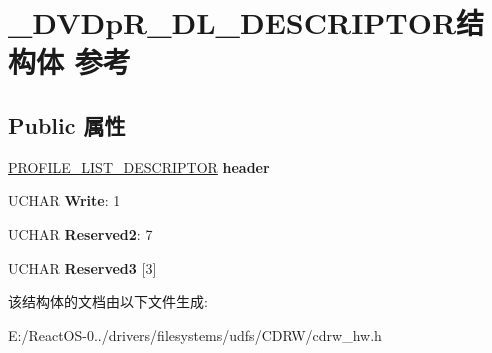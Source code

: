 \hypertarget{struct___d_v_dp_r___d_l___d_e_s_c_r_i_p_t_o_r}{}\section{\+\_\+\+D\+V\+Dp\+R\+\_\+\+D\+L\+\_\+\+D\+E\+S\+C\+R\+I\+P\+T\+O\+R结构体 参考}
\label{struct___d_v_dp_r___d_l___d_e_s_c_r_i_p_t_o_r}
\subsection*{Public 属性}
\begin{DoxyCompactItemize}
\item 
\mbox{\label{struct___d_v_dp_r___d_l___d_e_s_c_r_i_p_t_o_r_accf2fffafdd79b4c1d4f7f52979d760c}} 
\hyperlink{struct___p_r_o_f_i_l_e___l_i_s_t___d_e_s_c_r_i_p_t_o_r}{P\+R\+O\+F\+I\+L\+E\+\_\+\+L\+I\+S\+T\+\_\+\+D\+E\+S\+C\+R\+I\+P\+T\+OR} {\bfseries header}
\item 
\mbox{\label{struct___d_v_dp_r___d_l___d_e_s_c_r_i_p_t_o_r_a4c9d08a17f0e34e5d4f3aa69d9cc2932}} 
U\+C\+H\+AR {\bfseries Write}\+: 1
\item 
\mbox{\label{struct___d_v_dp_r___d_l___d_e_s_c_r_i_p_t_o_r_aaaac8ede019cc9d5d7821dc8c186e5b5}} 
U\+C\+H\+AR {\bfseries Reserved2}\+: 7
\item 
\mbox{\label{struct___d_v_dp_r___d_l___d_e_s_c_r_i_p_t_o_r_a25c466ea1f4a37051a595545a0aed162}} 
U\+C\+H\+AR {\bfseries Reserved3} \mbox{[}3\mbox{]}
\end{DoxyCompactItemize}


该结构体的文档由以下文件生成\+:\begin{DoxyCompactItemize}
\item 
E\+:/\+React\+O\+S-\/0../drivers/filesystems/udfs/\+C\+D\+R\+W/cdrw\+\_\+hw.\+h\end{DoxyCompactItemize}
